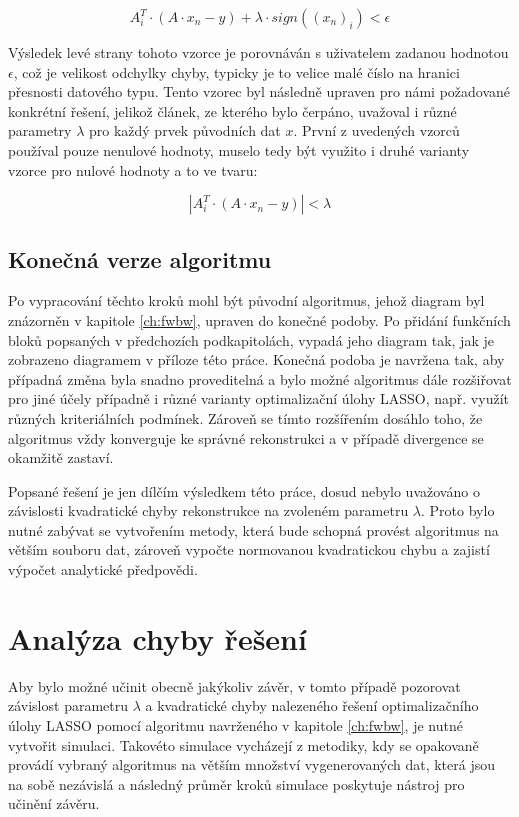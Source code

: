 \documentclass[FM,BP]{tulthesis}
\newcounter{Vzorce}
\begin{document}
\begin{equation} \label{eq:homotopy1}  \tag{Vzorec \theVzorce}
A_{i}^{T}\cdot(A \cdot x_{n} - y) + \lambda \cdot sign((x_{n})_{i}) < \epsilon
\end{equation}

Výsledek levé strany tohoto vzorce je porovnáván s uživatelem zadanou hodnotou $\epsilon$, což je velikost odchylky chyby, typicky je to velice malé číslo na hranici přesnosti datového typu. Tento vzorec byl následně upraven pro námi požadované konkrétní řešení, jelikož článek, ze kterého bylo čerpáno, uvažoval i různé parametry $\lambda$ pro každý prvek původních dat $x$. První z uvedených vzorců používal pouze nenulové hodnoty, muselo tedy být využito i druhé varianty vzorce pro nulové hodnoty a to ve tvaru:

\begin{equation} \label{eq:homotopy2}  \tag{Vzorec \theVzorce}
\left|A_{i}^{T} \cdot (A \cdot x_{n} - y)\right| < \lambda
\end{equation}


\section{Konečná verze algoritmu}
\label{subch:finalAlg}
Po vypracování těchto kroků mohl být původní algoritmus, jehož diagram byl znázorněn v kapitole \ref{ch:fwbw}, upraven do konečné podoby. Po přidání funkčních bloků popsaných v předchozích podkapitolách, vypadá jeho diagram tak, jak je zobrazeno diagramem v příloze této práce. Konečná podoba je navržena tak, aby případná změna byla snadno proveditelná a bylo možné algoritmus dále rozšiřovat pro jiné účely případně i různé varianty optimalizační úlohy LASSO, např. využít různých kriteriálních podmínek. Zároveň se tímto rozšířením dosáhlo toho, že algoritmus vždy konverguje ke správné rekonstrukci a v případě divergence se okamžitě zastaví. 

Popsané řešení je jen dílčím výsledkem této práce, dosud nebylo uvažováno o závislosti kvadratické chyby rekonstrukce na zvoleném parametru $\lambda$. Proto bylo nutné zabývat se vytvořením metody, která bude schopná provést algoritmus na větším souboru dat, zároveň vypočte normovanou kvadratickou chybu a zajistí výpočet analytické předpovědi.

\chapter{Analýza chyby řešení}
\label{ch:simulace}
Aby bylo možné učinit obecně jakýkoliv závěr, v tomto případě pozorovat závislost parametru $\lambda$ a kvadratické chyby nalezeného řešení optimalizačního úlohy LASSO pomocí algoritmu navrženého v kapitole \ref{ch:fwbw}, je nutné vytvořit simulaci. Takovéto simulace vycházejí z metodiky, kdy se opakovaně provádí vybraný algoritmus na větším množství vygenerovaných dat, která jsou na sobě nezávislá a následný průměr kroků simulace poskytuje nástroj pro učinění závěru.
\end{document}
